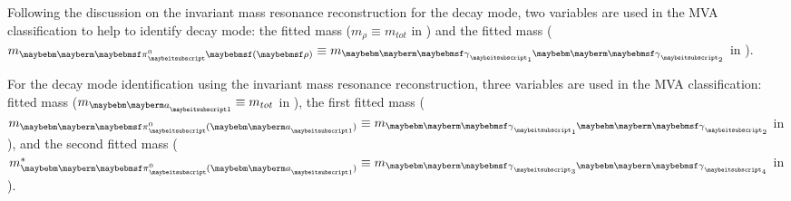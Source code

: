 









Following the discussion on the \Prho invariant mass resonance reconstruction for the \decayRhoShort  decay mode,  two variables are used in the MVA classification to help to identify  \decayRhoShort  decay mode: the fitted \Prho mass ($m_\rho \equiv m_{tot}$ in ) and the fitted \Ppizero mass ($m_{\Pgpz\parenths{\rho}} \equiv m_{\Pphoton_1\Pphoton_2}$ in  ).

For the \decayAiPhotonShort decay mode identification using the \Pai invariant mass resonance reconstruction, three variables are used in the MVA classification:  fitted \Pai mass ($m_{\Pai} \equiv m_{tot}$ in ), the first fitted \Ppizero mass ($m_{\Pgpz(\Pai)} \equiv m_{\Pphoton_1\Pphoton_2}$ in ), and the second fitted \Ppizero mass ($m^*_{\Pgpz(\Pai)} \equiv  m_{\Pphoton_3\Pphoton_4}$ in ).

